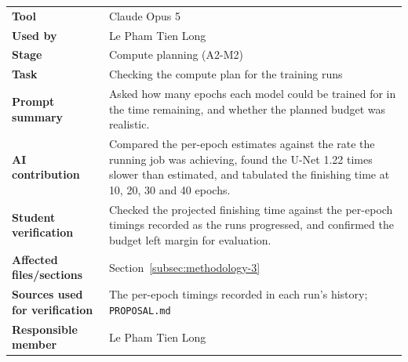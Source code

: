 \noindent\begin{minipage}{\textwidth}
\begin{tabularx}{\textwidth}{lX}
\hline
\textbf{Tool} & Claude Opus 5 \\
\textbf{Used by} & Le Pham Tien Long \\
\textbf{Stage} & Compute planning (A2-M2) \\
\textbf{Task} & Checking the compute plan for the training runs \\
\textbf{Prompt summary} & Asked how many epochs each model could be trained for in the time remaining, and whether the planned budget was realistic. \\
\textbf{AI contribution} & Compared the per-epoch estimates against the rate the running job was achieving, found the U-Net 1.22 times slower than estimated, and tabulated the finishing time at 10, 20, 30 and 40 epochs. \\
\textbf{Student verification} & Checked the projected finishing time against the per-epoch timings recorded as the runs progressed, and confirmed the budget left margin for evaluation. \\
\textbf{Affected files/sections} & Section~\ref{subsec:methodology-3} \\
\textbf{Sources used for verification} & The per-epoch timings recorded in each run's history; \texttt{PROPOSAL.md} \\
\textbf{Responsible member} & Le Pham Tien Long \\
\hline
\end{tabularx}
\end{minipage}

